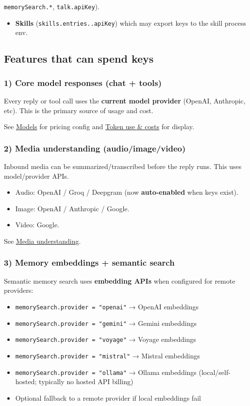 \texttt{memorySearch.*}, \texttt{talk.apiKey}).
\begin{itemize}
  \item \textbf{Skills} (\texttt{skills.entries..apiKey}) which may export keys to the skill process env.
\end{itemize}


\subsection{Features that can spend keys}


\subsubsection{1) Core model responses (chat + tools)}


Every reply or tool call uses the \textbf{current model provider} (OpenAI, Anthropic, etc). This is the
primary source of usage and cost.

See \href{/providers/models}{Models} for pricing config and \href{/reference/token-use}{Token use \& costs} for display.

\subsubsection{2) Media understanding (audio/image/video)}


Inbound media can be summarized/transcribed before the reply runs. This uses model/provider APIs.

\begin{itemize}
  \item Audio: OpenAI / Groq / Deepgram (now \textbf{auto-enabled} when keys exist).
  \item Image: OpenAI / Anthropic / Google.
  \item Video: Google.
\end{itemize}


See \href{/nodes/media-understanding}{Media understanding}.

\subsubsection{3) Memory embeddings + semantic search}


Semantic memory search uses \textbf{embedding APIs} when configured for remote providers:

\begin{itemize}
  \item \texttt{memorySearch.provider = "openai"} → OpenAI embeddings
  \item \texttt{memorySearch.provider = "gemini"} → Gemini embeddings
  \item \texttt{memorySearch.provider = "voyage"} → Voyage embeddings
  \item \texttt{memorySearch.provider = "mistral"} → Mistral embeddings
  \item \texttt{memorySearch.provider = "ollama"} → Ollama embeddings (local/self-hosted; typically no hosted API billing)
  \item Optional fallback to a remote provider if local embeddings fail
\end{itemize}


